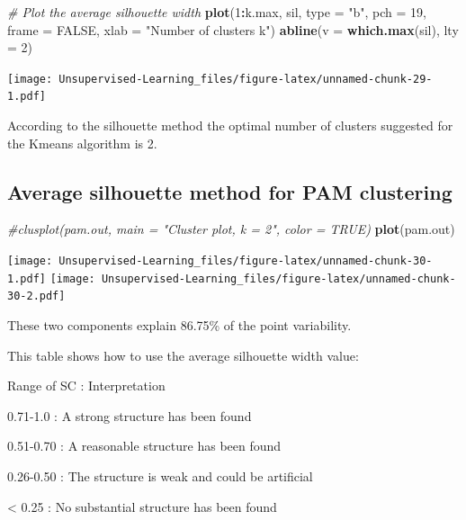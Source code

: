 \documentclass[
]{book}
\newenvironment{Shaded}{\begin{snugshade}}{\end{snugshade}}
\newcommand{\CommentTok}[1]{\textcolor[rgb]{0.56,0.35,0.01}{\textit{#1}}}
\newcommand{\DataTypeTok}[1]{\textcolor[rgb]{0.13,0.29,0.53}{#1}}
\newcommand{\DecValTok}[1]{\textcolor[rgb]{0.00,0.00,0.81}{#1}}
\newcommand{\KeywordTok}[1]{\textcolor[rgb]{0.13,0.29,0.53}{\textbf{#1}}}
\newcommand{\NormalTok}[1]{#1}
\newcommand{\OperatorTok}[1]{\textcolor[rgb]{0.81,0.36,0.00}{\textbf{#1}}}
\newcommand{\OtherTok}[1]{\textcolor[rgb]{0.56,0.35,0.01}{#1}}
\newcommand{\StringTok}[1]{\textcolor[rgb]{0.31,0.60,0.02}{#1}}
\begin{document}
\begin{Shaded}
\begin{Highlighting}[]
\CommentTok{# Plot the average silhouette width}
\KeywordTok{plot}\NormalTok{(}\DecValTok{1}\OperatorTok{:}\NormalTok{k.max, sil, }\DataTypeTok{type =} \StringTok{"b"}\NormalTok{, }\DataTypeTok{pch =} \DecValTok{19}\NormalTok{,}
\DataTypeTok{frame =} \OtherTok{FALSE}\NormalTok{, }\DataTypeTok{xlab =} \StringTok{"Number of clusters k"}\NormalTok{)}
\KeywordTok{abline}\NormalTok{(}\DataTypeTok{v =} \KeywordTok{which.max}\NormalTok{(sil), }\DataTypeTok{lty =} \DecValTok{2}\NormalTok{)}
\end{Highlighting}
\end{Shaded}

\texttt{[image: Unsupervised-Learning\_files/figure-latex/unnamed-chunk-29-1.pdf]}

According to the silhouette method the optimal number of clusters suggested for the Kmeans algorithm is 2.

\hypertarget{average-silhouette-method-for-pam-clustering}{%
\subsection{Average silhouette method for PAM clustering}\label{average-silhouette-method-for-pam-clustering}}

\begin{Shaded}
\begin{Highlighting}[]
\CommentTok{#clusplot(pam.out, main = "Cluster plot, k = 2", color = TRUE)}
\KeywordTok{plot}\NormalTok{(pam.out)}
\end{Highlighting}
\end{Shaded}

\texttt{[image: Unsupervised-Learning\_files/figure-latex/unnamed-chunk-30-1.pdf]} \texttt{[image: Unsupervised-Learning\_files/figure-latex/unnamed-chunk-30-2.pdf]}

These two components explain 86.75\% of the point variability.

This table shows how to use the average silhouette width value:

Range of SC : Interpretation

0.71-1.0 : A strong structure has been found

0.51-0.70 : A reasonable structure has been found

0.26-0.50 : The structure is weak and could be artificial

\textless{} 0.25 : No substantial structure has been found
\end{document}
